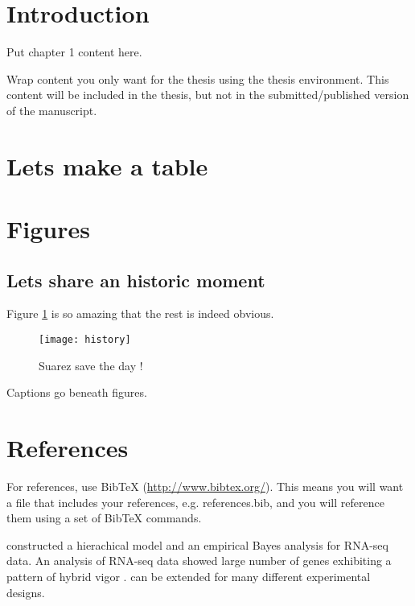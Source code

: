 
\section{Introduction}
Put chapter 1 content here.

\begin{thesis}
Wrap content you only want for the thesis using the thesis environment.  
This content will be included in the thesis, 
but not in the submitted/published version of the manuscript.
\end{thesis}

\section{Lets make a table} 
 

\section{Figures}

\subsection{Lets share an historic moment}

Figure \ref{history} is so amazing  that the rest is indeed obvious.
\begin{figure}[h!tb] \centering
\texttt{[image: history]}
\caption{Suarez save the day !}
\label{history}
\end{figure}
Captions go beneath figures.

\section{References}

For references, use BibTeX (\url{http://www.bibtex.org/}).
This means you will want a file that includes your references, 
e.g. references.bib, and you will reference them using a set of BibTeX commands.

\cite{niemi2015empirical} constructed a hierachical model and an empirical 
Bayes analysis for RNA-seq data. 
An analysis of RNA-seq data showed large number of genes exhibiting a pattern
of hybrid vigor \citep{niemi2015empirical}.
\citeauthor{niemi2015empirical} can be extended for many different experimental
designs.
